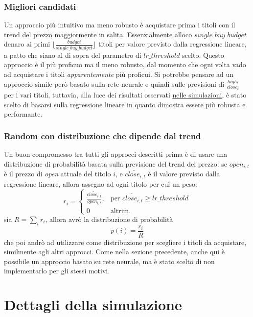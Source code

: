\documentclass[binding=0.6cm]{sapthesis}
\begin{document}
			\subsection{Migliori candidati}
				Un approccio più intuitivo ma meno robusto è acquistare prima i titoli con il trend del prezzo maggiormente in salita. Essenzialmente alloco $single\_buy\_budget$ denaro ai
				primi $\lfloor\frac{budget}{single\_buy\_budget}\rfloor$ titoli per valore previsto dalla regressione lineare, a patto che siano al di sopra del parametro di $lr\_threshold$ scelto. Questo
				approccio è il più proficuo ma il meno robusto, dal momento che ogni volta vado ad acquistare i titoli \textit{apparentemente} più proficui. Si potrebbe pensare ad un approccio simile però
				basato sulla rete neurale e quindi sulle previsioni di $\frac{high_t}{close_t}$ per i vari titoli, tuttavia, alla luce dei risultati osservati \underline{\hyperref[sec:results]{nelle simulazioni}},
				è stato scelto di basarsi sulla regressione lineare in quanto dimostra essere più robusta e performante.
			\subsection{Random con distribuzione che dipende dal trend}
				Un buon compromesso tra tutti gli approcci descritti prima è di usare una distribuzione di probabilità basata sulla previsione del trend del prezzo: se $open_{i,t}$ è il prezzo di
				\textit{open} attuale del titolo $i$, e $\tilde{close_{i,t}}$ è il valore previsto dalla regressione lineare, allora assegno ad ogni titolo per cui un peso:
				\[
					r_i = \begin{cases}
						\frac{\tilde{close_{i,t}}}{open_{i,t}}, &{ \text{per } \tilde{close_{i,t}} \geq lr\_threshold } \\
						0 &{ \text{altrim.} }
					\end{cases}
				\]
				sia $R = \sum_i r_i$, allora avrò la distribuzione di probabilità
				\[
					p(i) = \frac{r_i}{R}
				\]
				che poi andrò ad utilizzare come distribuzione per scegliere i titoli da acquistare, similmente agli altri approcci. Come nella sezione precedente, anche qui è possibile un approccio basato
				su rete neurale, ma è stato scelto di non implementarlo per gli stessi motivi.
	\chapter{Dettagli della simulazione}
\end{document}

